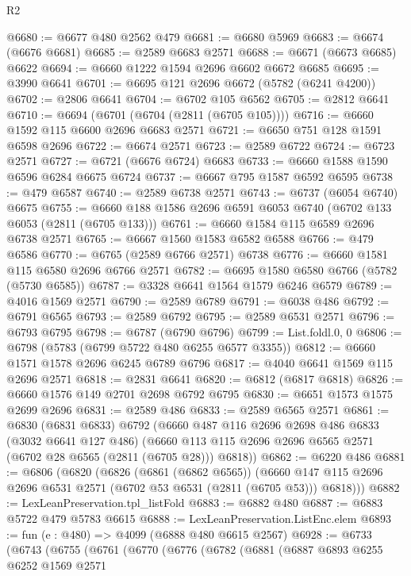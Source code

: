 \begin{lexlean}{R2}
\begin{coremodule}
@6680 := @6677 @480 @2562 @479
@6681 := @6680 @5969
@6683 := @6674 (@6676 @6681)
@6685 := @2589 @6683 @2571
@6688 := @6671 (@6673 @6685) @6622
@6694 := @6660 @1222 @1594 @2696 @6602 @6672 @6685
@6695 := @3990 @6641
@6701 := @6695 @121 @2696 @6672 (@5782 (@6241 @4200))
@6702 := @2806 @6641
@6704 := @6702 @105 @6562
@6705 := @2812 @6641
@6710 := @6694 (@6701 (@6704 (@2811 (@6705 @105))))
@6716 := @6660 @1592 @115 @6600 @2696 @6683 @2571
@6721 := @6650 @751 @128 @1591 @6598 @2696
@6722 := @6674 @2571
@6723 := @2589 @6722
@6724 := @6723 @2571
@6727 := @6721 (@6676 @6724) @6683
@6733 := @6660 @1588 @1590 @6596 @6284 @6675 @6724
@6737 := @6667 @795 @1587 @6592 @6595
@6738 := @479 @6587
@6740 := @2589 @6738 @2571
@6743 := @6737 (@6054 @6740) @6675
@6755 := @6660 @188 @1586 @2696 @6591 @6053 @6740 (@6702 @133 @6053 (@2811 (@6705 @133)))
@6761 := @6660 @1584 @115 @6589 @2696 @6738 @2571
@6765 := @6667 @1560 @1583 @6582 @6588
@6766 := @479 @6586
@6770 := @6765 (@2589 @6766 @2571) @6738
@6776 := @6660 @1581 @115 @6580 @2696 @6766 @2571
@6782 := @6695 @1580 @6580 @6766 (@5782 (@5730 @6585))
@6787 := @3328 @6641 @1564 @1579 @6246 @6579
@6789 := @4016 @1569 @2571
@6790 := @2589 @6789
@6791 := @6038 @486
@6792 := @6791 @6565
@6793 := @2589 @6792
@6795 := @2589 @6531 @2571
@6796 := @6793 @6795
@6798 := @6787 (@6790 @6796)
@6799 := List.foldl.{0, 0}
@6806 := @6798 (@5783 (@6799 @5722 @480 @6255 @6577 @3355))
@6812 := @6660 @1571 @1578 @2696 @6245 @6789 @6796
@6817 := @4040 @6641 @1569 @115 @2696 @2571
@6818 := @2831 @6641
@6820 := @6812 (@6817 @6818)
@6826 := @6660 @1576 @149 @2701 @2698 @6792 @6795
@6830 := @6651 @1573 @1575 @2699 @2696
@6831 := @2589 @486
@6833 := @2589 @6565 @2571
@6861 := @6830
    (@6831 @6833)
    @6792
    (@6660
      @487
      @116
      @2696
      @2698
      @486
      @6833
      (@3032 @6641 @127 @486)
      (@6660 @113 @115 @2696 @2696 @6565 @2571 (@6702 @28 @6565 (@2811 (@6705 @28))) @6818))
@6862 := @6220 @486
@6881 := @6806
    (@6820
      (@6826
        (@6861 (@6862 @6565))
        (@6660 @147 @115 @2696 @2696 @6531 @2571 (@6702 @53 @6531 (@2811 (@6705 @53))) @6818)))
@6882 := LexLeanPreservation.tpl_listFold
@6883 := @6882 @480
@6887 := @6883 @5722 @479 @5783 @6615
@6888 := LexLeanPreservation.ListEnc.elem
@6893 := fun (e : @480) => @4099 (@6888 @480 @6615 @2567)
@6928 := @6733
    (@6743
      (@6755
        (@6761
          (@6770
            (@6776
              (@6782
                (@6881
                  (@6887
                    @6893
                    @6255
                    @6252
                    @1569
                    @2571

\end{coremodule}
\end{lexlean}
